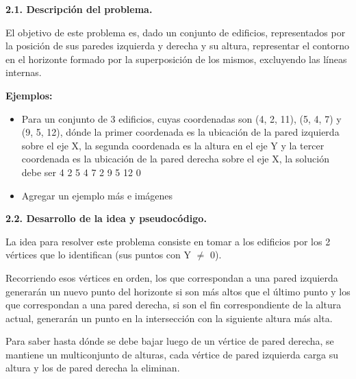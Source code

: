 \noindent
\textbf{2.1. Descripción del problema.}

\vspace*{0.3cm}

El objetivo de este problema es, dado un conjunto de edificios, representados
por la posición de sus paredes izquierda y derecha y su altura, representar el
contorno en el horizonte formado por la superposición de los mismos, excluyendo
las líneas internas. \medskip

\textbf{Ejemplos:}
\begin{itemize}
  \item Para un conjunto de 3 edificios, cuyas coordenadas son (4, 2, 11),
  (5, 4, 7) y (9, 5, 12), dónde la primer coordenada es la ubicación de la pared
  izquierda sobre el eje X, la segunda coordenada es la altura en el eje Y y la
  tercer coordenada es la ubicación de la pared derecha sobre el eje X, la
  solución debe ser 4 2 5 4 7 2 9 5 12 0
  \item Agregar un ejemplo más e imágenes
\end{itemize}


\vspace*{0.75cm} \noindent



\noindent
\textbf{2.2. Desarrollo de la idea y pseudocódigo.}

\vspace*{0.3cm}

La idea para resolver este problema consiste en tomar a los edificios por los 2
vértices que lo identifican (sus puntos con Y $\neq$ 0).

Recorriendo esos vértices en orden, los que correspondan a una pared izquierda
generarán un nuevo punto del horizonte si son más altos que el último punto y
los que correspondan a una pared derecha, si son el fin correspondiente de la
altura actual, generarán un punto en la intersección con la siguiente altura
más alta.

Para saber hasta dónde se debe bajar luego de un vértice de pared derecha, se
mantiene un multiconjunto de alturas, cada vértice de pared izquierda carga su
altura y los de pared derecha la eliminan.

